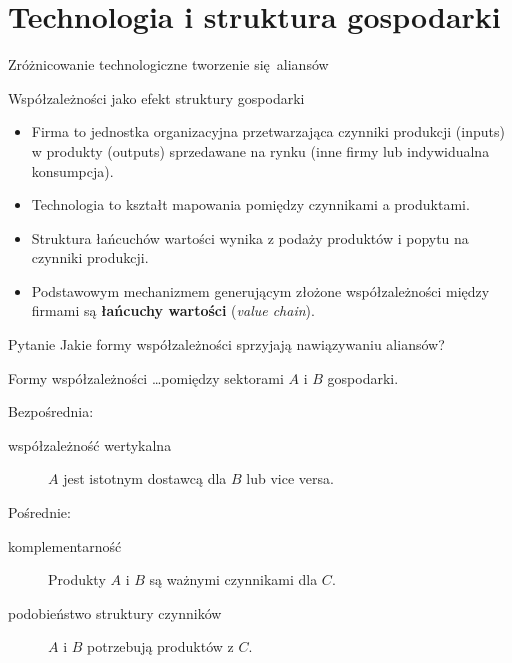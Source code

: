 \documentclass{beamer}
\renewcommand{\emph}[1]{\textbf{#1}}
\begin{document}
\section{Technologia i struktura gospodarki}

\begin{frame}
	\begin{center}
		\begin{Huge}
			Zróżnicowanie technologiczne tworzenie się aliansów
		\end{Huge}
	\end{center}
\end{frame}

\begin{frame}{Współzależności jako efekt struktury gospodarki}

	\begin{itemize}
		\item Firma to jednostka organizacyjna przetwarzająca czynniki produkcji
			(inputs) w produkty (outputs) sprzedawane na rynku (inne firmy lub
			indywidualna konsumpcja).

		\item Technologia to kształt mapowania pomiędzy czynnikami a produktami.

		\item Struktura łańcuchów wartości wynika z podaży produktów i popytu na
			czynniki produkcji.

		\item Podstawowym mechanizmem generującym złożone współzależności między
			firmami są \emph{łańcuchy wartości} (\textit{value chain}).
	\end{itemize}

	\begin{block}{Pytanie}
		Jakie formy współzależności sprzyjają nawiązywaniu aliansów?
	\end{block}
\end{frame}


\begin{frame}{Formy współzależności}
	\dots pomiędzy sektorami $A$ i $B$ gospodarki.

	\bigskip

	Bezpośrednia:
	\begin{description}
		\item[współzależność wertykalna] $A$ jest istotnym dostawcą dla $B$ lub vice versa.
	\end{description}

	Pośrednie:
	\begin{description}
		\item[komplementarność] Produkty $A$ i $B$ są ważnymi czynnikami dla $C$.
		\item[podobieństwo struktury czynników] $A$ i $B$ potrzebują produktów z $C$.
		\end{description}
\end{frame}
\end{document}

